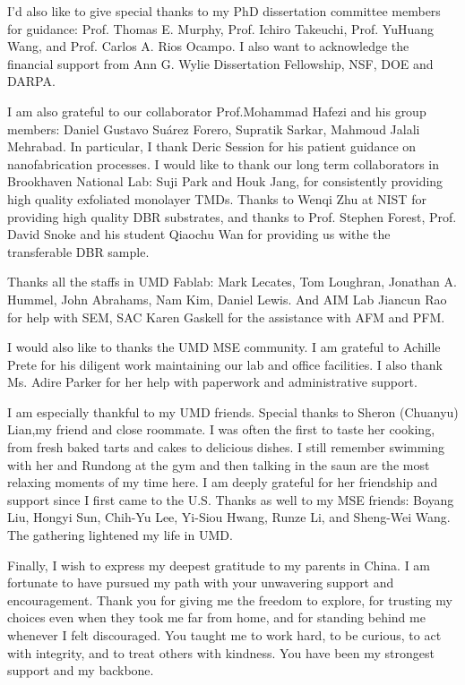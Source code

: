 I'd also like to give special thanks to my PhD dissertation committee members for guidance: Prof. Thomas E. Murphy, Prof. Ichiro Takeuchi, Prof. YuHuang Wang, and Prof. Carlos A. Rios Ocampo. 
I also want to acknowledge the financial support from Ann G. Wylie Dissertation Fellowship, NSF, DOE and DARPA.

I am also grateful to our collaborator Prof.Mohammad Hafezi and his group members: Daniel Gustavo Suárez Forero, Supratik Sarkar, Mahmoud Jalali Mehrabad.
In particular, I thank Deric Session for his patient guidance on nanofabrication processes. 
I would like to thank our long term collaborators in Brookhaven National Lab: Suji Park and Houk Jang, for consistently providing high quality exfoliated monolayer TMDs. 
Thanks to Wenqi Zhu at NIST for providing high quality DBR substrates, and thanks to Prof. Stephen Forest, Prof. David Snoke and his student Qiaochu Wan for providing us withe the transferable DBR sample.

Thanks all the staffs in UMD Fablab: 
Mark Lecates, Tom Loughran, Jonathan A. Hummel, John Abrahams, Nam Kim, Daniel Lewis.
And AIM Lab Jiancun Rao for help with SEM,
SAC Karen Gaskell for the assistance with AFM and PFM.

I would also like to thanks the UMD MSE community. 
I am grateful to Achille Prete for his diligent work maintaining our lab and office facilities. I also thank Ms. Adire Parker for her help with paperwork and administrative support.

I am especially thankful to my UMD friends. 
Special thanks to Sheron (Chuanyu) Lian,my friend and close roommate. I was often the first to taste her cooking, from fresh baked tarts and cakes to delicious dishes. 
I still remember swimming with her and Rundong at the gym and then talking in the saun are the most relaxing moments of my time here. 
I am deeply grateful for her friendship and support since I first came to the U.S. 
Thanks as well to my MSE friends: Boyang Liu, Hongyi Sun, Chih-Yu Lee, Yi-Siou Hwang, Runze Li, and Sheng-Wei Wang.
The gathering lightened my life in UMD.

Finally, I wish to express my deepest gratitude to my parents in China. 
I am fortunate to have pursued my path with your unwavering support and encouragement.
Thank you for giving me the freedom to explore, for trusting my choices even when they took me far from home, and for standing behind me whenever I felt discouraged.
You taught me to work hard, to be curious, to act with integrity, and to treat others with kindness.
You have been my strongest support and my backbone. 

